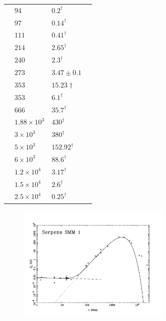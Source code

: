 \documentclass[9pt]{extarticle}   	%
\begin{document}
\begin{table}
\begin{center}
\begin{tabular}{llll}
 & $94$ & $0.2^{\dag}$ & \citet{1999ApJ...513..350H}\\
 & $97$ & $0.14^{\dag}$ & \citet{1994ApJ...424..222M}\\
 & $111$ & $0.41^{\dag}$ & \citet{1999ApJ...513..350H}\\
 & $214$ & $2.65^{\dag}$ & \citet{1999ApJ...513..350H}\\
 & $240$ & $2.3^{\dag}$ & \citet{1994ApJ...424..222M}\\
 & $273$ & $3.47\pm0.1$ & \citet{1993AA...275..195C}\\
 & $353$ & $15.23{\dag}$ & \citet{2008ApJS..175..277D}\\
 & $353$ & $6.1^{\dag}$ & \citet{1999MNRAS.309..141D}\\
 & $666$ & $35.7^{\dag}$ & \citet{1999MNRAS.309..141D}\\
 & $1.88\times10^{3}$ & $430^{\dag}$ & \citet{1994ApJ...424..222M}\\
 & $3\times10^{3}$ & $380^{\dag}$ & \citet{1994ApJ...424..222M}\\
 & $5\times10^{3}$ & $152.92^{\dag}$ & \citet{1994ApJ...424..222M}\\
 & $6\times10^{3}$ & $88.6^{\dag}$ & \citet{1994ApJ...424..222M}\\
 & $1.2\times10^{4}$ & $3.17^{\dag}$ & \citet{1994ApJ...424..222M}\\
 & $1.5\times10^{4}$ & $2.6^{\dag}$ & \citet{1994ApJ...424..222M}\\
 & $2.5\times10^{4}$ & $0.25^{\dag}$ & \citet{1994ApJ...424..222M}\\
\end{tabular}
\end{center}
\label{default}
\end{table}%

\clearpage
\begin{figure}[htbp]
\begin{center}
\includegraphics[width=0.65\textwidth]{plots/Serpens.pdf}
\label{default}
\end{center}
\end{figure}
\end{document}
